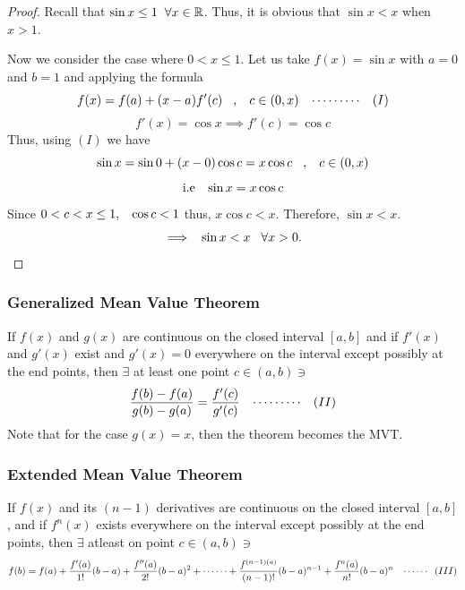 \documentclass[11pt,a4paper]{article}
\theoremstyle{definition}
\begin{document}
\begin{proof}


Recall that $\sin x \leq 1 \hspace{0.2cm} \forall x \in \mathbb{R}$. Thus, it is obvious that $\sin x <x$ when $x> 1.$


Now we consider the case where $0< x \leq 1$. Let us take $f(x) = \sin x $ with $a = 0$ and $b = 1$ and applying the formula $$f(x) = f(a) + (x - a) f'(c)\hspace{0.3cm},\hspace{0.3cm} c\in (0, x)\hspace{0.3cm} \cdots\cdots\cdots\hspace{0.3cm} (I)$$
$$f'(x) = \cos x \implies f'(c) = \cos c$$
Thus, using $(I)$ we have $$\sin x = \sin 0 + (x -0) \cos c = x\cos c \hspace{0.3cm} , \hspace{0.3cm} c \in (0,x)$$
$$\text{i.e}\hspace{0.3cm} \sin x = x \cos c$$
Since $0 < c < x \leq 1, \hspace{0.3cm} \cos c < 1$ thus, $x\cos c < x$. Therefore, $\sin x < x$. $$\implies \hspace{0.2cm} \sin x < x\hspace{0.3cm} \forall x > 0.$$
\end{proof}


\subsubsection{Generalized Mean Value Theorem}
If $f(x)$ and $g(x)$ are continuous on the closed interval $[a,b]$ and if $f'(x)$ and $g'(x)$ exist and $g'(x) = 0$ everywhere on the interval except possibly at the end points, then $\exists$ at least one point $c\in (a,b) \ni$ $$\frac{f(b) - f(a)}{g(b) - g(a)} = \frac{f'(c)}{g'(c)}\hspace{0.3cm} \cdots\cdots\cdots\hspace{0.3cm} (II)$$
Note that for the case $g(x) = x$, then the theorem becomes the MVT.


\subsubsection{Extended Mean Value Theorem}
If $f(x)$ and its $(n-1)$ derivatives are continuous on the closed interval $[a,b]$, and if $f^n(x)$ exists everywhere on the interval except possibly at the end points, then $\exists$ atleast on point $c\in (a,b) \ni$
$$f(b) = f(a) + \frac{f'(a)}{1!}(b - a) + \frac{f''(a)}{2!}(b - a)^2 + \cdots\cdots + \frac{f^{(n-1)(a)}}{(n-1)!}(b - a)^{n-1} + \frac{f^n(a)}{n!}(b - a)^n\hspace{0.3cm}\cdots\cdots\hspace{0.2cm} (III)$$
\end{document}
